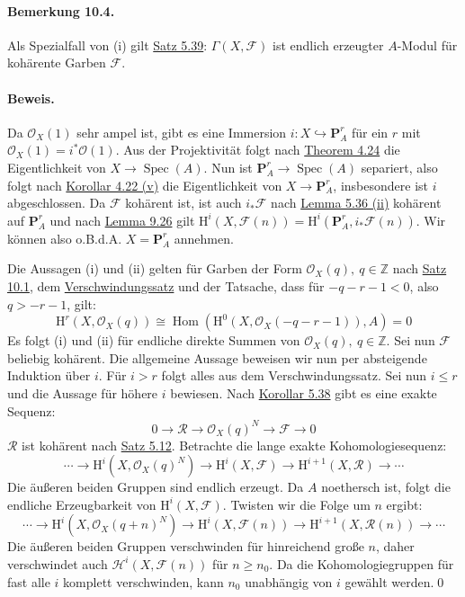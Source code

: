 \paragraph{Bemerkung 10.4.}\label{10.4} Als Spezialfall von (i) gilt \hyperref[5.39]{Satz 5.39}: $\Gamma(X,\mathcal{F})$ ist endlich erzeugter $A$-Modul für kohärente Garben $\mathcal{F}$.

\paragraph{Beweis.} Da $\mathcal{O}_X(1)$ sehr ampel ist, gibt es eine Immersion $i:X\hookrightarrow  \mathbf{P}_A^r$ für ein $r$ mit $\mathcal{O}_X(1)=i^\ast\mathcal{O}(1)$. Aus der Projektivität folgt nach \hyperref[4.24]{Theorem 4.24} die Eigentlichkeit von $X\to\operatorname{Spec}(A)$. Nun ist $\mathbf{P}_A^r\to\operatorname{Spec}(A)$ separiert, also folgt nach \hyperref[4.22]{Korollar 4.22 (v)} die Eigentlichkeit von $X\to\mathbf{P}_A^r$, insbesondere ist $i$ abgeschlossen. Da $\mathcal{F}$ kohärent ist, ist auch $i_\ast\mathcal{F}$ nach \hyperref[5.36]{Lemma 5.36 (ii)} kohärent auf $\mathbf{P}_A^r$ und nach \hyperref[9.26]{Lemma 9.26} gilt $\mathrm{H}^i(X,\mathcal{F}(n)) =\mathrm{H}^i(\mathbf{P}_A^r, i_\ast\mathcal{F}(n))$. Wir können also o.B.d.A. $X=\mathbf{P}_A^r$ annehmen.

Die Aussagen (i) und (ii) gelten für Garben der Form $\mathcal{O}_X(q),\ q\in\mathbb{Z}$ nach \hyperref[10.1]{Satz 10.1}, dem \hyperref[9.27]{Verschwindungssatz} und der Tatsache, dass für $-q-r-1<0$, also $q>-r-1$, gilt:
\[\mathrm{H}^r(X,\mathcal{O}_X(q)) \cong \operatorname{Hom}(\mathrm{H}^0(X,\mathcal{O}_X(-q-r-1)), A) =0 \]
Es folgt (i) und (ii) für endliche direkte Summen von $\mathcal{O}_X(q),\ q\in\mathbb{Z}$. Sei nun $\mathcal{F}$ beliebig kohärent. Die allgemeine Aussage beweisen wir nun per absteigende Induktion über $i$. Für $i>r$ folgt alles aus dem Verschwindungssatz. Sei nun $i\leq r$ und die Aussage für höhere $i$ bewiesen. Nach \hyperref[5.38]{Korollar 5.38} gibt es eine exakte Sequenz:
\[0\longrightarrow\mathcal{R}\longrightarrow\mathcal{O}_X(q)^N\longrightarrow\mathcal{F}\longrightarrow 0 \]
$\mathcal{R}$ ist kohärent nach \hyperref[5.12]{Satz 5.12}. Betrachte die lange exakte Kohomologiesequenz:
\[\cdots\longrightarrow \mathrm{H}^i(X,\mathcal{O}_X(q)^N)\longrightarrow\mathrm{H}^i(X,\mathcal{F})\longrightarrow\mathrm{H}^{i+1}(X,\mathcal{R})\longrightarrow\cdots \]
Die äußeren beiden Gruppen sind endlich erzeugt. Da $A$ noethersch ist, folgt die endliche Erzeugbarkeit von $\mathrm{H}^i(X,\mathcal{F})$. Twisten wir die Folge um $n$ ergibt:
\[\cdots\longrightarrow \mathrm{H}^i(X,\mathcal{O}_X(q+n)^N)\longrightarrow\mathrm{H}^i(X,\mathcal{F}(n))\longrightarrow\mathrm{H}^{i+1}(X,\mathcal{R}(n))\longrightarrow\cdots\]
Die äußeren beiden Gruppen verschwinden für hinreichend große $n$, daher verschwindet auch $\mathcal{H}^i(X,\mathcal{F}(n))$ für $n\geq n_0$. Da die Kohomologiegruppen für fast alle $i$ komplett verschwinden, kann $n_0$ unabhängig von $i$ gewählt werden.\qed

